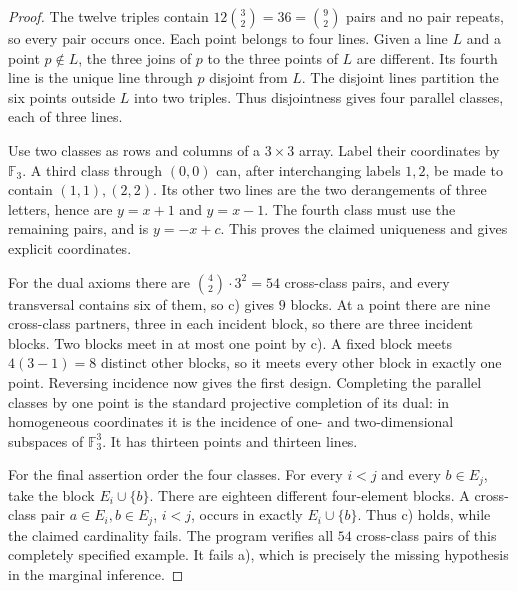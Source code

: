 \begin{proof}
The twelve triples contain $12\binom32=36=\binom92$ pairs and no pair
repeats, so every pair occurs once. Each point belongs to four lines.
Given a line $L$ and a point $p\notin L$, the three joins of $p$ to the
three points of $L$ are different. Its fourth line is the unique line
through $p$ disjoint from $L$. The disjoint lines partition the six
points outside $L$ into two triples. Thus disjointness gives four
parallel classes, each of three lines.

Use two classes as rows and columns of a $3\times3$ array. Label their
coordinates by $\mathbb F_3$. A third class through $(0,0)$ can, after
interchanging labels $1,2$, be made to contain $(1,1),(2,2)$. Its other
two lines are the two derangements of three letters, hence are
$y=x+1$ and $y=x-1$. The fourth class must use the remaining pairs,
and is $y=-x+c$. This proves the claimed uniqueness and gives explicit
coordinates.

For the dual axioms there are $\binom42\cdot3^2=54$ cross-class pairs,
and every transversal contains six of them, so c) gives $9$ blocks.
At a point there are nine cross-class partners, three in each incident
block, so there are three incident blocks. Two blocks meet in at most
one point by c). A fixed block meets $4(3-1)=8$ distinct other blocks,
so it meets every other block in exactly one point. Reversing incidence
now gives the first design. Completing the parallel classes by one
point is the standard projective completion of its dual: in homogeneous
coordinates it is the incidence of one- and two-dimensional subspaces
of $\mathbb F_3^3$. It has thirteen points and thirteen lines.

For the final assertion order the four classes. For every $i<j$ and
every $b\in E_j$, take the block $E_i\cup\{b\}$. There are eighteen
different four-element blocks. A cross-class pair $a\in E_i,b\in E_j$,
$i<j$, occurs in exactly $E_i\cup\{b\}$. Thus c) holds, while the
claimed cardinality fails. The program verifies all $54$ cross-class
pairs of this completely specified example. It fails a), which is
precisely the missing hypothesis in the marginal inference.
\end{proof}

